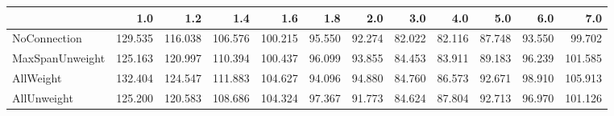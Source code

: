 \begin{tabular}{lrrrrrrrrrrr}
\toprule
{} &     1.0 &     1.2 &     1.4 &     1.6 &    1.8 &    2.0 &    3.0 &    4.0 &    5.0 &    6.0 &     7.0 \\
\midrule
NoConnection    & 129.535 & 116.038 & 106.576 & 100.215 & 95.550 & 92.274 & 82.022 & 82.116 & 87.748 & 93.550 &  99.702 \\
MaxSpanUnweight & 125.163 & 120.997 & 110.394 & 100.437 & 96.099 & 93.855 & 84.453 & 83.911 & 89.183 & 96.239 & 101.585 \\
AllWeight       & 132.404 & 124.547 & 111.883 & 104.627 & 94.096 & 94.880 & 84.760 & 86.573 & 92.671 & 98.910 & 105.913 \\
AllUnweight     & 125.200 & 120.583 & 108.686 & 104.324 & 97.367 & 91.773 & 84.624 & 87.804 & 92.713 & 96.970 & 101.126 \\
\bottomrule
\end{tabular}
